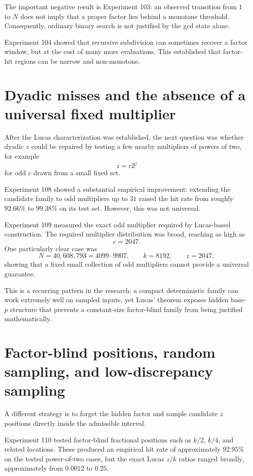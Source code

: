 \documentclass[11pt,a4paper]{article}
\begin{document}
The important negative result is Experiment 103: an observed transition from $1$ to $N$ does not imply that a proper factor lies behind a monotone threshold. Consequently, ordinary binary search is not justified by the gcd state alone.

Experiment 104 showed that recursive subdivision can sometimes recover a factor window, but at the cost of many more evaluations. This established that factor-hit regions can be narrow and non-monotone.

\section{Dyadic misses and the absence of a universal fixed multiplier}
\label{sec:multipliers}

After the Lucas characterization was established, the next question was whether dyadic $z$ could be repaired by testing a few nearby multipliers of powers of two, for example
\[
z=c2^j
\]
for odd $c$ drawn from a small fixed set.

Experiment 108 showed a substantial empirical improvement: extending the candidate family to odd multipliers up to $31$ raised the hit rate from roughly $92.66\%$ to $99.38\%$ on its test set. However, this was not universal.

Experiment 109 measured the exact odd multiplier required by Lucas-based construction. The required multiplier distribution was broad, reaching as high as
\[
 c=2047.
\]
One particularly clear case was
\[
N=40{,}608{,}793=4099\cdot9907,
\qquad k=8192,
\qquad z=2047,
\]
showing that a fixed small collection of odd multipliers cannot provide a universal guarantee.

This is a recurring pattern in the research: a compact deterministic family can work extremely well on sampled inputs, yet Lucas' theorem exposes hidden base-$p$ structure that prevents a constant-size factor-blind family from being justified mathematically.

\section{Factor-blind positions, random sampling, and low-discrepancy sampling}
\label{sec:sampling}

A different strategy is to forget the hidden factor and sample candidate $z$ positions directly inside the admissible interval.

Experiment 110 tested factor-blind fractional positions such as $k/2$, $k/4$, and related locations. These produced an empirical hit rate of approximately $92.95\%$ on the tested power-of-two cases, but the exact Lucas $z/k$ ratios ranged broadly, approximately from $0.0012$ to $0.25$.
\end{document}
